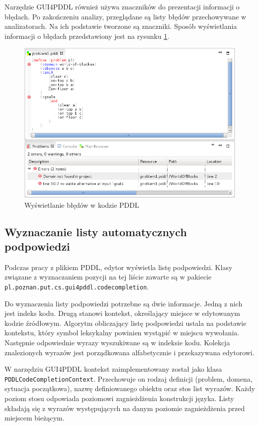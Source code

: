 Narzędzie GUI4PDDL również używa znaczników do prezentacji informacji o błędach. Po zakończeniu 
analizy, przeglądane są listy błędów przechowywane w analizatorach. Na ich podstawie tworzone
są znaczniki. Sposób wyświetlania informacji o błędach przedstawiony jest na rysunku \ref{ana_markers}.

\begin{figure}[h]
  \centering
    \includegraphics[scale=0.5]{img/ana_markers.png}
    \caption{Wyświetlanie błędów w kodzie PDDL}
    \label{ana_markers}
\end{figure}


\subsection{Wyznaczanie listy automatycznych podpowiedzi}
\begin{sloppypar}
Podczas pracy z plikiem PDDL, edytor wyświetla listę podpowiedzi. Klasy związane z wyznaczaniem
pozycji na tej liście zawarte są w pakiecie \texttt{pl.poznan.put.cs.gui4pddl.codecompletion}.
\end{sloppypar}

Do wyznaczenia listy podpowiedzi potrzebne są dwie informacje. Jedną z nich jest indeks kodu.
Drugą stanowi kontekst, określający miejsce w edytowanym kodzie źródłowym. Algorytm obliczający 
listę podpowiedzi ustala na podstawie kontekstu, który symbol leksykalny powinien wystąpić w miejscu 
wywołania. Następnie odpowiednie wyrazy wyszukiwane są w indeksie kodu. Kolekcja znalezionych 
wyrazów jest porządkowana alfabetycznie i przekazywana edytorowi.

\begin{sloppypar}
W narzędziu GUI4PDDL kontekst zaimplementowany został jako klasa \texttt{PDDLCodeCompletionContext}.
Przechowuje on rodzaj definicji (problem, domena,
sytuacja początkowa), nazwę definiowanego obiektu oraz stos list wyrazów. Każdy poziom stosu odpowiada
poziomowi zagnieżdżenia konstrukcji języka. Listy składają się z wyrazów występujących na danym poziomie
zagnieżdżenia przed miejscem bieżącym.
\end{sloppypar}

